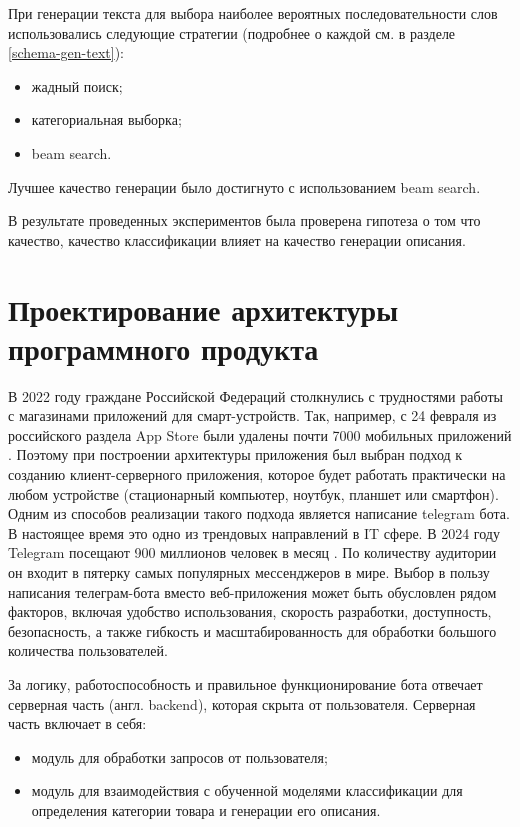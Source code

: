 \documentclass[a4paper,12pt]{extarticle}
\begin{document}
При генерации текста для выбора наиболее вероятных последовательности слов использовались следующие стратегии (подробнее о каждой см. в разделе \ref{schema-gen-text}):
\begin{itemize}
	\item жадный поиск;
	\item категориальная выборка;
	\item beam search.
\end{itemize}

Лучшее качество генерации было достигнуто с использованием beam search.

В результате проведенных экспериментов была проверена гипотеза о том что качество, качество классификации влияет на качество генерации описания.

\newpage
\section{Проектирование архитектуры программного продукта}
В 2022 году граждане Российской Федераций столкнулись с трудностями работы с магазинами приложений для смарт-устройств. Так, например, с 24 февраля из российского раздела App Store были удалены почти 7000 мобильных приложений \cite{russiaapp}. Поэтому при построении архитектуры приложения был выбран подход к созданию клиент-серверного приложения, которое будет работать практически на любом устройстве (стационарный компьютер, ноутбук, планшет или смартфон). Одним из способов реализации такого подхода является написание telegram  бота. В настоящее время это одно из трендовых направлений в IT сфере. В 2024 году Telegram посещают 900 миллионов человек в месяц \cite{telegram-stats}. По количеству аудитории он входит в пятерку самых популярных мессенджеров в мире. Выбор в пользу написания телеграм-бота вместо веб-приложения может быть обусловлен рядом факторов, включая удобство использования, скорость разработки, доступность, безопасность, а также гибкость и масштабированность для обработки большого количества пользователей.

За логику, работоспособность и правильное функционирование бота 
отвечает серверная часть (англ. backend), которая скрыта от пользователя. Серверная часть включает в себя:
\begin{itemize}
	\item модуль для обработки запросов от пользователя;
	\item модуль для взаимодействия с обученной моделями классификации для определения категории товара и генерации его описания.
\end{itemize}
\end{document}
